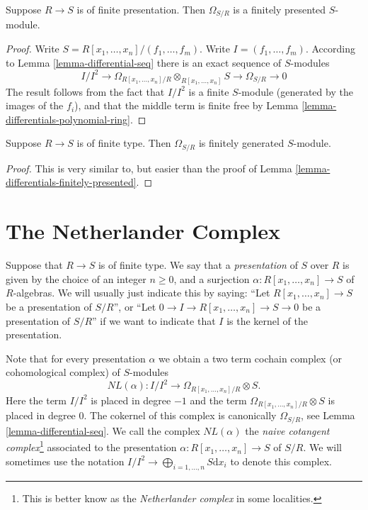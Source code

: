 \begin{lemma}
\label{lemma-differentials-finitely-presented}
Suppose $R \to S$ is of finite presentation.
Then $\Omega_{S/R}$ is a finitely presented
$S$-module.
\end{lemma}

\begin{proof}
Write $S = R[x_1, \ldots, x_n]/(f_1, \ldots, f_m)$.
Write $I = (f_1, \ldots, f_m)$. According
to Lemma \ref{lemma-differential-seq} there is an exact sequence
of $S$-modules
$$
I/I^2
\to
\Omega_{R[x_1, \ldots, x_n]/R}\otimes_{R[x_1, \ldots, x_n]} S
\to
\Omega_{S/R}
\to
0
$$
The result follows from the fact that $I/I^2$ is a finite
$S$-module (generated by the images of the $f_i$), and that
the middle term is finite free by
Lemma \ref{lemma-differentials-polynomial-ring}.
\end{proof}

\begin{lemma}
\label{lemma-differentials-finitely-generated}
Suppose $R \to S$ is of finite type.
Then $\Omega_{S/R}$ is finitely generated
$S$-module.
\end{lemma}

\begin{proof}
This is very similar to, but easier than the proof
of Lemma \ref{lemma-differentials-finitely-presented}.
\end{proof}









\section{The Netherlander Complex}
\label{section-netherlander}

\noindent
Suppose that $R \to S$ is of finite type.
We say that a {\it presentation} of $S$ over $R$ is
given by the choice of an integer $n \geq 0$, and
a surjection $\alpha : R[x_1, \ldots, x_n] \to S$
of $R$-algebras. We will usually just indicate
this by saying: ``Let $R[x_1, \ldots, x_n] \to S$ be a presentation of
$S/R$'', or ``Let $0\to I \to R[x_1, \ldots, x_n] \to S \to 0$
be a presentation of $S/R$'' if we want to indicate that $I$
is the kernel of the presentation.

\medskip\noindent
Note that for every presentation $\alpha$ we obtain a two term
cochain complex (or cohomological complex) of $S$-modules
$$
NL(\alpha) :
I/I^2 \longrightarrow \Omega_{R[x_1, \ldots, x_n]/R}\otimes S.
$$
Here the term $I/I^2$ is placed in degree $-1$ and
the term $\Omega_{R[x_1, \ldots, x_n]/R}\otimes S$ is
placed in degree $0$.
The cokernel of this complex is canonically $\Omega_{S/R}$,
see Lemma \ref{lemma-differential-seq}. We call the complex
$NL(\alpha)$
the {\it naive cotangent complex}\footnote{This is better know as the {\it
Netherlander complex} in some localities.} associated to the
presentation $\alpha : R[x_1, \ldots, x_n] \to S$ of $S/R$. We will
sometimes use the notation
$I/I^2 \to \bigoplus_{i = 1, \ldots, n} S\text{d}x_i$
to denote this complex.

